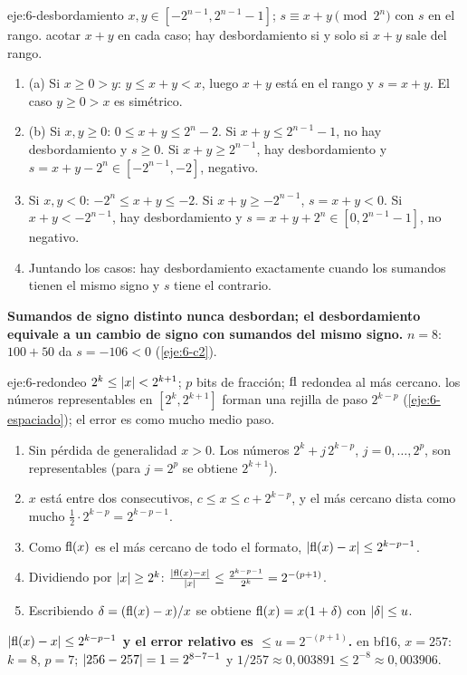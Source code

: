 \begin{solucion}{eje:6-desbordamiento}
\datos $x,y\in[-2^{n-1},2^{n-1}-1]$; $s\equiv x+y\pmod{2^n}$ con $s$ en el rango.
\planteamiento acotar $x+y$ en cada caso; hay desbordamiento si y solo si $x+y$ sale del rango.
\pasos
\begin{enumerate}[label=\arabic*.]
  \item (a) Si $x\ge0>y$: $y\le x+y<x$, luego $x+y$ está en el rango y $s=x+y$. El caso $y\ge0>x$ es simétrico.
  \item (b) Si $x,y\ge0$: $0\le x+y\le2^n-2$. Si $x+y\le2^{n-1}-1$, no hay desbordamiento y $s\ge0$. Si $x+y\ge2^{n-1}$, hay desbordamiento y $s=x+y-2^n\in[-2^{n-1},-2]$, negativo.
  \item Si $x,y<0$: $-2^n\le x+y\le-2$. Si $x+y\ge-2^{n-1}$, $s=x+y<0$. Si $x+y<-2^{n-1}$, hay desbordamiento y $s=x+y+2^n\in[0,2^{n-1}-1]$, no negativo.
  \item Juntando los casos: hay desbordamiento exactamente cuando los sumandos tienen el mismo signo y $s$ tiene el contrario.
\end{enumerate}
\resultado \textbf{Sumandos de signo distinto nunca desbordan; el desbordamiento equivale a un cambio de signo con sumandos del mismo signo.}
\comprobacion $n=8$: $100+50$ da $s=-106<0$ (\cref{eje:6-c2}).
\end{solucion}

\begin{solucion}{eje:6-redondeo}
\datos $2^k\le\lvert x\rvert<2^{k+1}$; $p$ bits de fracción; $\operatorname{fl}$ redondea al más cercano.
\planteamiento los números representables en $[2^k,2^{k+1}]$ forman una rejilla de paso $2^{k-p}$ (\cref{eje:6-espaciado}); el error es como mucho medio paso.
\pasos
\begin{enumerate}[label=\arabic*.]
  \item Sin pérdida de generalidad $x>0$. Los números $2^k+j\,2^{k-p}$, $j=0,\dots,2^p$, son representables (para $j=2^p$ se obtiene $2^{k+1}$).
  \item $x$ está entre dos consecutivos, $c\le x\le c+2^{k-p}$, y el más cercano dista como mucho $\frac12\cdot2^{k-p}=2^{k-p-1}$.
  \item Como $\operatorname{fl}(x)$ es el más cercano de todo el formato, $\lvert\operatorname{fl}(x)-x\rvert\le2^{k-p-1}$.
  \item Dividiendo por $\lvert x\rvert\ge2^k$: $\frac{\lvert\operatorname{fl}(x)-x\rvert}{\lvert x\rvert}\le\frac{2^{k-p-1}}{2^k}=2^{-(p+1)}$.
  \item Escribiendo $\delta=(\operatorname{fl}(x)-x)/x$ se obtiene $\operatorname{fl}(x)=x(1+\delta)$ con $\lvert\delta\rvert\le u$.
\end{enumerate}
\resultado \textbf{$\lvert\operatorname{fl}(x)-x\rvert\le2^{k-p-1}$ y el error relativo es $\le u=2^{-(p+1)}$.}
\comprobacion en bf16, $x=257$: $k=8$, $p=7$; $\lvert256-257\rvert=1=2^{8-7-1}$ y $1/257\approx0{,}003891\le2^{-8}\approx0{,}003906$.
\end{solucion}
